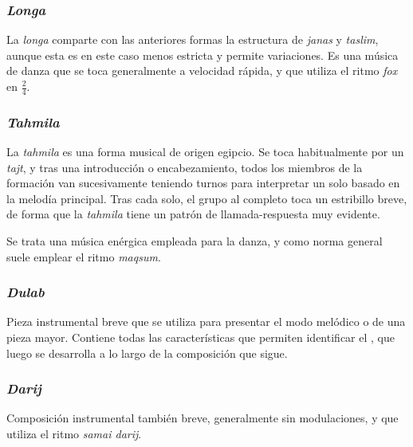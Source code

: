 
    \subsubsection{\emph{Longa}}

        La \emph{longa} comparte con las anteriores formas la estructura de \emph{janas} y \emph{taslim}, aunque esta es en este caso menos estricta y permite variaciones. Es una música de danza que se toca generalmente a velocidad rápida, y que utiliza el ritmo \emph{fox} en $\frac{2}{4}$.


    \subsubsection{\emph{Tahmila}}

        La \emph{tahmila} es una forma musical de origen egipcio. Se toca habitualmente por un \emph{tajt}, y tras una introducción o encabezamiento, todos los miembros de la formación van sucesivamente teniendo turnos para interpretar un solo basado en la melodía principal. Tras cada solo, el grupo al completo toca un estribillo breve, de forma que la \emph{tahmila} tiene un patrón de llamada-respuesta muy evidente.

        Se trata una música enérgica empleada para la danza, y como norma general suele emplear el ritmo \emph{maqsum}.


    \subsubsection{\emph{Dulab}}

        Pieza instrumental breve que se utiliza para presentar el modo melódico o \maqam de una pieza mayor. Contiene todas las características que permiten identificar el \maqam, que luego se desarrolla a lo largo de la composición que sigue.


    \subsubsection{\emph{Darij}}

        Composición instrumental también breve, generalmente sin modulaciones, y que utiliza el ritmo \emph{samai darij}.

